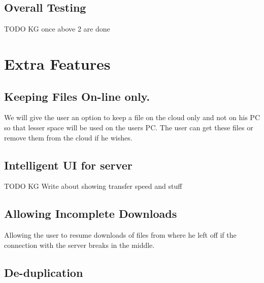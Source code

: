 \documentclass{article}
\begin{document}
			\subsection{Overall Testing}
				TODO KG once above 2 are done

	\section{Extra Features}
		\subsection{Keeping Files On-line only.}
				We will give the user an option to keep a file on the cloud only and not on his PC so that lesser space will be used on the users PC. The user can get these files or remove them from the cloud if he wishes.
		\subsection{Intelligent UI for server}
			TODO KG
			Write about showing transfer speed and stuff
		\subsection{Allowing Incomplete Downloads}
			Allowing the user to resume downloads of files from where he left off if the connection with the server breaks in the middle.
		\subsection{De-duplication}
\end{document}

